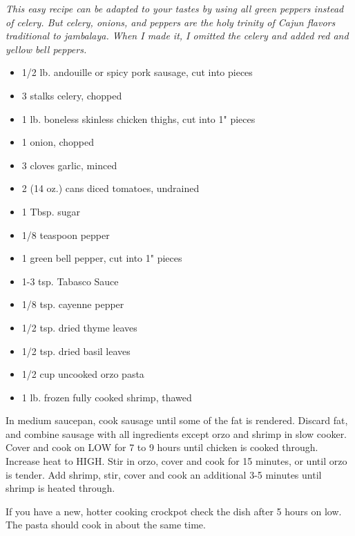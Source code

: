 \fromMom

\emph{This easy recipe can be adapted to your tastes by using all green
peppers instead of celery. But celery, onions, and peppers are the holy
trinity of Cajun flavors traditional to jambalaya. When I made it, I
omitted the celery and added red and yellow bell peppers.}

\ingredients
\begin{itemize}
\item 1/2 lb. andouille or spicy pork sausage, cut into pieces
\item 3 stalks celery, chopped
\item 1 lb. boneless skinless chicken thighs, cut into 1" pieces
\item 1 onion, chopped
\item 3 cloves garlic, minced
\item 2 (14 oz.) cans diced tomatoes, undrained
\item 1 Tbsp. sugar
\item 1/8 teaspoon pepper
\item 1 green bell pepper, cut into 1" pieces
\item 1-3 tsp. Tabasco Sauce
\item 1/8 tsp. cayenne pepper
\item 1/2 tsp. dried thyme leaves
\item 1/2 tsp. dried basil leaves
\item 1/2 cup uncooked orzo pasta
\item 1 lb. frozen fully cooked shrimp, thawed
\end{itemize}

\instructions
In medium saucepan, cook sausage until some of the fat is rendered.
Discard fat, and combine sausage with all ingredients except orzo and
shrimp in slow cooker. Cover and cook on LOW for 7 to 9 hours until
chicken is cooked through. Increase heat to HIGH. Stir in orzo, cover
and cook for 15 minutes, or until orzo is tender. Add shrimp, stir,
cover and cook an additional 3-5 minutes until shrimp is heated through.

If you have a new, hotter cooking crockpot check the dish after 5 hours
on low. The pasta should cook in about the same time.
